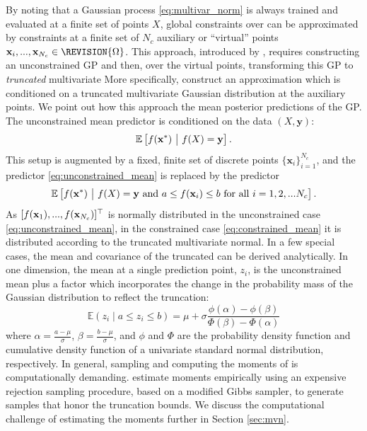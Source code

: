 \label{sec:daveiga}
By noting that a Gaussian process \eqref{eq:multivar_norm} is always trained and evaluated at a finite set of points $X$, global constraints over  can be approximated by constraints at a finite set of $N_c$ auxiliary or ``virtual'' points $\mathbf{x}_i, ..., \mathbf{x}_{N_c} \in \REVISION{\Omega}$. This approach, introduced by , requires constructing an unconstrained GP and then, over the virtual points, transforming this GP to  \emph{truncated} multivariate 
More specifically,  construct an approximation which is conditioned on a truncated multivariate Gaussian distribution at the auxiliary points.
We point out how this approach  the mean posterior predictions of the GP.
The unconstrained mean predictor is conditioned on the data $(X, \mathbf{y})$: 
\begin{equation}\label{eq:unconstrained_mean}
\mathbb{E}\left[ f(\bold{x}^*) \ \big| \ f(X) = \bold{y} \right].
\end{equation}
This setup is augmented by a fixed, finite set of discrete points $\{\mathbf{x}_i\}_{i=1}^{N_c}$, and the predictor \eqref{eq:unconstrained_mean} is replaced by the predictor 
\begin{equation}\label{eq:constrained_mean}
\mathbb{E}\left[ f(\bold{x}^*) \ \big| \ f(X) = \bold{y} \text{ and } a \le f(\mathbf{x}_i) \le b \text{ for all $i = 1, 2, ... N_c$}\right].
\end{equation}
As $[f(\bold{x}_1), ..., f(\bold{x}_{N_c})]^\top$ is normally distributed in the unconstrained case \eqref{eq:unconstrained_mean}, in the constrained case \eqref{eq:constrained_mean} it is distributed according to the truncated multivariate normal. 
In a few special cases, the mean and covariance of the truncated  can be derived analytically.  In one dimension, the mean at a 
single prediction point, $z_i$, is the unconstrained mean plus a factor which incorporates 
the change in the probability mass of the Gaussian distribution to reflect the truncation: 
\begin{equation}
\mathbb{E} \left({z_i} \mid  a\leq z_i\leq b \right) = \mu + \sigma\frac{\phi(\alpha)-\phi(\beta)}{\Phi(\beta)-\Phi(\alpha)}
\end{equation}
where $\alpha = \frac{a - \mu}{\sigma}$, $\beta = \frac{b-\mu}{\sigma}$, and $\phi$ and $\Phi$ are the probability density function and cumulative density function of a univariate standard normal distribution, respectively. In general, sampling and computing the moments of  is computationally demanding.  estimate moments empirically using an expensive rejection sampling procedure, based on a modified Gibbs sampler, to generate samples that honor the truncation bounds. We discuss the computational challenge of estimating the moments further in Section \ref{sec:mvn}. 

